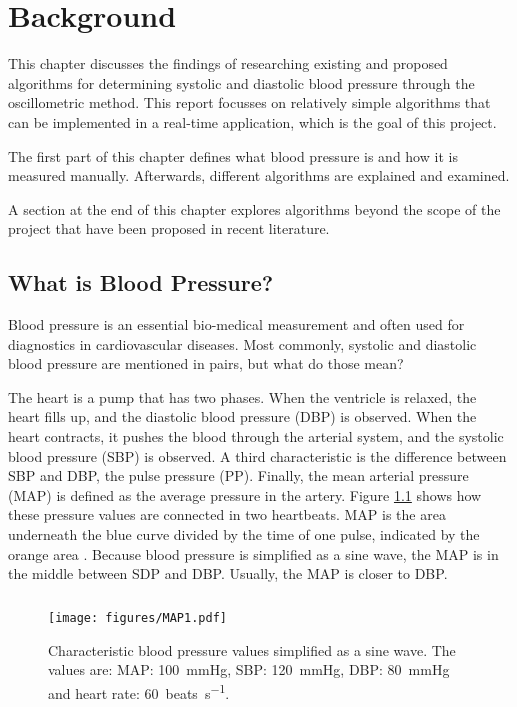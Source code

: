 \chapter{Background}\label{cp:theory}
This chapter discusses the findings of researching existing and proposed algorithms for determining systolic and diastolic blood pressure through the oscillometric method. This report focusses on relatively simple algorithms that can be implemented in a real-time application, which is the goal of this project.

The first part of this chapter defines what blood pressure is and how it is measured manually. Afterwards, different algorithms are explained and examined. 

A section at the end of this chapter explores algorithms beyond the scope of the project that have been proposed in recent literature.

\section{What is Blood Pressure?}

Blood pressure is an essential bio-medical measurement and often used for diagnostics in cardiovascular diseases. Most commonly, systolic and diastolic blood pressure are mentioned in pairs, but what do those mean?

The heart is a pump that has two phases. When the ventricle is relaxed, the heart fills up, and the diastolic blood pressure (DBP) is observed. When the heart contracts, it pushes the blood through the arterial system, and the systolic blood pressure (SBP) is observed. A third characteristic is the difference between SBP and DBP, the pulse pressure (PP). Finally, the mean arterial pressure (MAP) is defined as the average pressure in the artery. Figure \ref{fig:BP} shows how these pressure values are connected in two heartbeats. MAP is the area underneath the blue curve divided by the time of one pulse, indicated by the orange area \citep{Boron2012}. Because blood pressure is simplified as a sine wave, the MAP is in the middle between SDP and DBP. Usually, the MAP is closer to DBP. \paragraph{}


\begin{figure}[ht]
\centering
\texttt{[image: figures/MAP1.pdf]}
\caption{Characteristic blood pressure values simplified as a sine wave. The values are: MAP: \SI{100}{\mmHg}, SBP: \SI{120}{\mmHg}, DBP: \SI{80}{\mmHg} and heart rate: \SI{60}{beats\per\second}.}
\label{fig:BP}
\end{figure}

